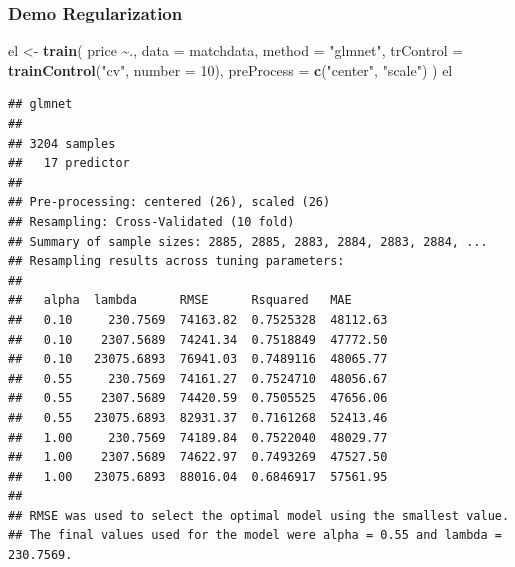 \documentclass[
  shownotes,
  xcolor={svgnames},
  hyperref={colorlinks,citecolor=DarkBlue,linkcolor=DarkRed,urlcolor=DarkBlue}
  ]{beamer}
\newenvironment{Shaded}{\begin{snugshade}}{\end{snugshade}}
\newcommand{\DataTypeTok}[1]{\textcolor[rgb]{0.13,0.29,0.53}{#1}}
\newcommand{\DecValTok}[1]{\textcolor[rgb]{0.00,0.00,0.81}{#1}}
\newcommand{\KeywordTok}[1]{\textcolor[rgb]{0.13,0.29,0.53}{\textbf{#1}}}
\newcommand{\NormalTok}[1]{#1}
\newcommand{\OperatorTok}[1]{\textcolor[rgb]{0.81,0.36,0.00}{\textbf{#1}}}
\newcommand{\StringTok}[1]{\textcolor[rgb]{0.31,0.60,0.02}{#1}}
\begin{document}
\begin{frame}[fragile]
\frametitle{Demo Regularization}

\begin{tiny}
\begin{Shaded}
\begin{Highlighting}[]
\NormalTok{el \textless{}{-}}\StringTok{ }\KeywordTok{train}\NormalTok{(}
\NormalTok{  price }\OperatorTok{\textasciitilde{}}\NormalTok{., }\DataTypeTok{data =}\NormalTok{ matchdata, }\DataTypeTok{method =} \StringTok{"glmnet"}\NormalTok{,}
  \DataTypeTok{trControl =} \KeywordTok{trainControl}\NormalTok{(}\StringTok{"cv"}\NormalTok{, }\DataTypeTok{number =} \DecValTok{10}\NormalTok{), }\DataTypeTok{preProcess =} \KeywordTok{c}\NormalTok{(}\StringTok{"center"}\NormalTok{, }\StringTok{"scale"}\NormalTok{)}
\NormalTok{  )}
\NormalTok{el}
\end{Highlighting}
\end{Shaded}
\end{tiny}
\begin{tiny}

\begin{verbatim}
## glmnet 
## 
## 3204 samples
##   17 predictor
## 
## Pre-processing: centered (26), scaled (26) 
## Resampling: Cross-Validated (10 fold) 
## Summary of sample sizes: 2885, 2885, 2883, 2884, 2883, 2884, ... 
## Resampling results across tuning parameters:
## 
##   alpha  lambda      RMSE      Rsquared   MAE     
##   0.10     230.7569  74163.82  0.7525328  48112.63
##   0.10    2307.5689  74241.34  0.7518849  47772.50
##   0.10   23075.6893  76941.03  0.7489116  48065.77
##   0.55     230.7569  74161.27  0.7524710  48056.67
##   0.55    2307.5689  74420.59  0.7505525  47656.06
##   0.55   23075.6893  82931.37  0.7161268  52413.46
##   1.00     230.7569  74189.84  0.7522040  48029.77
##   1.00    2307.5689  74622.97  0.7493269  47527.50
##   1.00   23075.6893  88016.04  0.6846917  57561.95
## 
## RMSE was used to select the optimal model using the smallest value.
## The final values used for the model were alpha = 0.55 and lambda = 230.7569.
\end{verbatim}
\end{tiny}
\end{frame}
\end{document}
